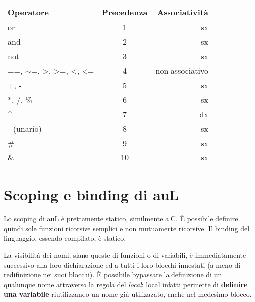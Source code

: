 \documentclass{article}
\begin{document}
\begin{table}[h]
\begin{tabular}{lcr}
\hline
Operatore                                                               & Precedenza & Associatività   \\ \hline\hline
or                                                                      & 1          & sx              \\
and                                                                     & 2          & sx              \\
not                                                                     & 3          & sx              \\
==, $\sim$=, \textgreater{}, \textgreater{}=, \textless{}, \textless{}= & 4          & non associativo \\
+, -                                                                    & 5          & sx              \\
$*$, /, \%                                                                & 6          & sx              \\
\textasciicircum{}                                                      & 7          & dx              \\
- (unario)                                                              & 8          & sx              \\
\#                                                                      & 9          & sx              \\
\&                                                                      & 10         & sx              \\ \hline
\end{tabular}
\end{table}

\section{Scoping e binding  di auL}
Lo scoping di auL è prettamente statico, similmente a C. È possibile definire quindi sole funzioni ricorsive semplici
e non mutuamente ricorsive. Il binding del linguaggio, essendo compilato, è statico.

La visibilità dei nomi, siano queste di funzioni o di variabili, è immediatamente successivo alla loro dichiarazione 
ed a tutti i loro blocchi innestati (a meno di redifinizione nei suoi blocchi). È possibile bypassare la definizione 
di un qualunque nome attraverso la regola del \textit{local}: local infatti permette di \textbf{definire una variabile} 
riutilizzando un nome già utilizazato, anche nel medesimo blocco.
\end{document}
